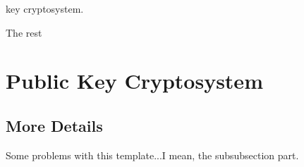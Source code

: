 \documentclass[12pt,journal,compsoc]{IEEEtran}
\begin{document}
%
%
%
%
 key cryptosystem. 
\par
The rest 







\section{Public Key Cryptosystem}
\label{sec:publ-key-crypt}

\subsection{More Details}

Some problems with this template...I mean, the subsubsection part.
\end{document}

